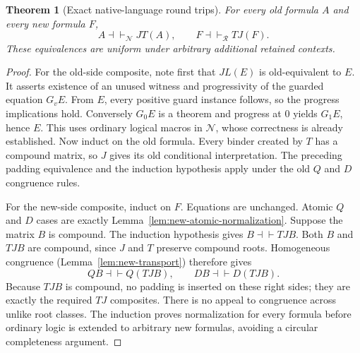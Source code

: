 \documentclass[11pt,a4paper]{article}
\newtheorem{theorem}{Theorem}[section]
\theoremstyle{definition}\newtheorem{definition}[theorem]{Definition}
\begin{document}
\begin{theorem}[Exact native-language round trips]
\label{thm:new-roundtrips}
For every old formula $A$ and every new formula $F$,
\begin{equation}
 A\dashv\vdash_{\mathcal N}JT(A),\qquad
 F\dashv\vdash_{\mathcal R}TJ(F).
 \label{eq:new-roundtrips}
\end{equation}
These equivalences are uniform under arbitrary additional retained contexts.
\end{theorem}
\begin{proof}
For the old-side composite, note first that $JL(E)$ is old-equivalent to
$E$.  It asserts existence of an unused witness and progressivity of the
guarded equation $G_vE$.  From $E$, every positive guard instance follows,
so the progress implications hold.  Conversely $G_0E$ is a theorem and
progress at $0$ yields $G_1E$, hence $E$.  This uses ordinary logical
macros in $\mathcal N$, whose correctness is already established.
Now induct on the old formula.  Every binder created by $T$ has a compound
matrix, so $J$ gives its old conditional interpretation.  The preceding
padding equivalence and the induction hypothesis apply under the old
$Q$ and $D$ congruence rules.

For the new-side composite, induct on $F$.  Equations are unchanged.
Atomic $Q$ and $D$ cases are exactly
Lemma~\ref{lem:new-atomic-normalization}.  Suppose the matrix $B$ is
compound.  The induction hypothesis gives $B\dashv\vdash TJB$.
Both $B$ and $TJB$ are compound, since $J$ and $T$ preserve compound roots.
Homogeneous congruence (Lemma~\ref{lem:new-transport}) therefore gives
\[
 Q B\dashv\vdash Q(TJB),\qquad
 D B\dashv\vdash D(TJB).
\]
Because $TJB$ is compound, no padding is inserted on these right sides;
they are exactly the required $TJ$ composites.  There is no appeal to
congruence across unlike root classes.  The induction proves normalization
for every formula before ordinary logic is extended to arbitrary new
formulas, avoiding a circular completeness argument.
\end{proof}
\end{document}

